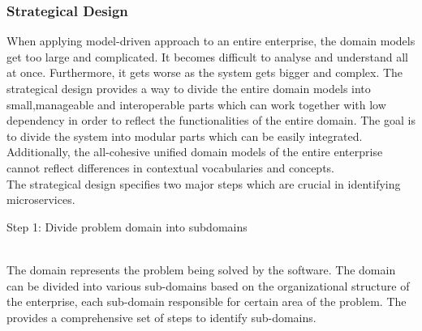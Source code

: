 \subsubsection{Strategical Design}\label{section:domain_driven_design/process_to_domain_driven_design/strategical_design}
When applying model-driven approach to an entire enterprise, the domain models get too large and complicated. It becomes difficult to analyse and understand all at once. Furthermore, it gets worse as the system gets bigger and complex. The strategical design provides a way to divide the entire domain models into small,manageable and interoperable parts which can work together with low dependency in order to reflect the functionalities of the entire domain. The goal is to divide the system into modular parts which can be easily integrated. Additionally, the all-cohesive unified domain models of the entire enterprise cannot reflect differences in contextual vocabularies and concepts. \cite{Fowler:2014ab}\cite{Evans:2003aa}\cite{Vernon:2013aa}
\\
The strategical design specifies two major steps which are crucial in identifying microservices.
\\
\begin{shaded}Step 1: Divide problem domain into subdomains \end{shaded} \label{section:domain_driven_design/process_to_domain_driven_design/strategical_design/step_1}
\\
The domain represents the problem being solved by the software. The domain can be divided into various sub-domains based on the organizational structure of the enterprise, each sub-domain responsible for certain area of the problem. The \cite{Engels:2015aa} provides a comprehensive set of steps to identify sub-domains.
